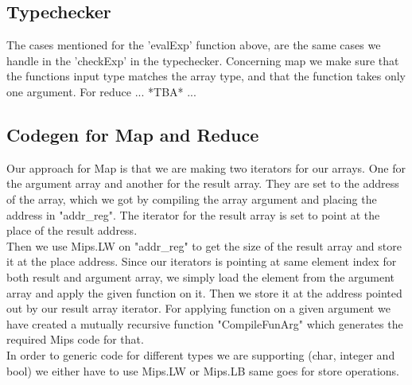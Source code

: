 \documentclass[12pt]{article}
\numberwithin{listing}{section}
\begin{document}
\subsection*{Typechecker}
The cases mentioned for the 'evalExp' function above, are the same cases we handle in the 'checkExp' in the typechecker. 
Concerning map we make sure that the functions input type matches the array type, and that the function takes only one argument. 
For reduce ...   *TBA*   ...


\subsection*{Codegen for Map and Reduce}
Our approach for Map is that we are making two iterators for our arrays. One for the argument array and another for the result array. They are set to the address of the array, which we got by compiling the array argument and placing the address in "addr\_reg". The iterator for the result array is set to point at the place of the result address.\\
Then we use Mips.LW on "addr\_reg" to get the size of the result array and store it at the place address. Since our iterators is pointing at same element index for both result and argument array, we simply load the element from the argument array and apply the given function on it. Then we store it at the address pointed out by our result array iterator. For applying function on a given argument we have created a mutually recursive function "CompileFunArg" which generates the required Mips code for that.\\

In order to generic code for different types we are supporting (char, integer and bool) we either have to use Mips.LW or Mips.LB same goes for store operations.
\end{document}
